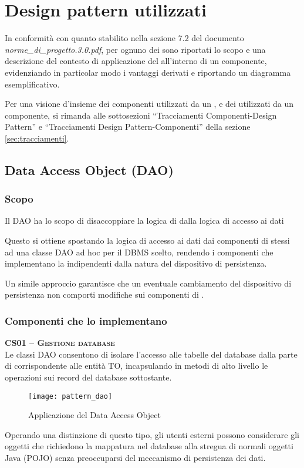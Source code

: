 \section{Design pattern utilizzati}
In conformità con quanto stabilito nella sezione 7.2 del documento \textit{norme\_di\_progetto.3.0.pdf}, per ognuno dei  sono riportati lo scopo e una descrizione del contesto di applicazione del  all'interno di un componente, evidenziando in particolar modo i vantaggi derivati e riportando un diagramma esemplificativo.

Per una visione d'insieme dei componenti utilizzati da un , e dei  utilizzati da un componente, si rimanda alle sottosezioni ``Tracciamenti Componenti-Design Pattern'' e ``Tracciamenti Design Pattern-Componenti'' della sezione \vref{sec:tracciamenti}.

\subsection{Data Access Object (DAO)}\label{sec:patterndao}

\subsubsection{Scopo}
Il  DAO ha lo scopo di disaccoppiare la logica di  dalla logica di accesso ai dati

Questo si ottiene spostando la logica di accesso ai dati dai componenti di  stessi ad una classe DAO ad hoc per il DBMS scelto, rendendo i componenti che implementano la  indipendenti dalla natura del dispositivo di persistenza.

Un simile approccio garantisce che un eventuale cambiamento del dispositivo di persistenza non comporti modifiche sui componenti di .

\subsubsection{Componenti che lo implementano}
\begin{description}
\item{\scshape\bfseries CS01 -- Gestione database}\\
Le classi DAO consentono di isolare l'accesso alle tabelle del database dalla parte di  corrispondente alle entità TO, incapsulando in metodi di alto livello le operazioni sui record del database sottostante.

\begin{figure}[H]
  \centering
  \texttt{[image: pattern\_dao]}
  \caption{Applicazione del  Data Access Object}\label{fig:dao}
\end{figure}

Operando una distinzione di questo tipo, gli utenti esterni possono considerare gli oggetti che richiedono la mappatura nel database alla stregua di normali oggetti Java (POJO) senza preoccuparsi del meccanismo di persistenza dei dati.
\end{description}

